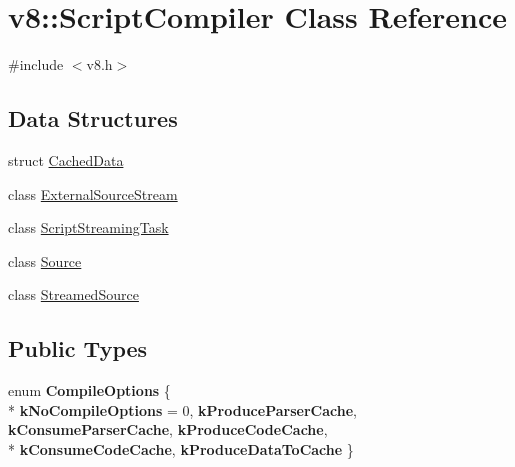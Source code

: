 \hypertarget{classv8_1_1ScriptCompiler}{}\section{v8\+:\+:Script\+Compiler Class Reference}
\label{classv8_1_1ScriptCompiler}


{\ttfamily \#include $<$v8.\+h$>$}

\subsection*{Data Structures}
\begin{DoxyCompactItemize}
\item 
struct \hyperlink{structv8_1_1ScriptCompiler_1_1CachedData}{Cached\+Data}
\item 
class \hyperlink{classv8_1_1ScriptCompiler_1_1ExternalSourceStream}{External\+Source\+Stream}
\item 
class \hyperlink{classv8_1_1ScriptCompiler_1_1ScriptStreamingTask}{Script\+Streaming\+Task}
\item 
class \hyperlink{classv8_1_1ScriptCompiler_1_1Source}{Source}
\item 
class \hyperlink{classv8_1_1ScriptCompiler_1_1StreamedSource}{Streamed\+Source}
\end{DoxyCompactItemize}
\subsection*{Public Types}
\begin{DoxyCompactItemize}
\item 
\hypertarget{classv8_1_1ScriptCompiler_aa6db7774ab5d8793cd88db6b35a71818}{}enum {\bfseries Compile\+Options} \{ \\*
{\bfseries k\+No\+Compile\+Options} = 0, 
{\bfseries k\+Produce\+Parser\+Cache}, 
{\bfseries k\+Consume\+Parser\+Cache}, 
{\bfseries k\+Produce\+Code\+Cache}, 
\\*
{\bfseries k\+Consume\+Code\+Cache}, 
{\bfseries k\+Produce\+Data\+To\+Cache}
 \}\label{classv8_1_1ScriptCompiler_aa6db7774ab5d8793cd88db6b35a71818}

\end{DoxyCompactItemize}
